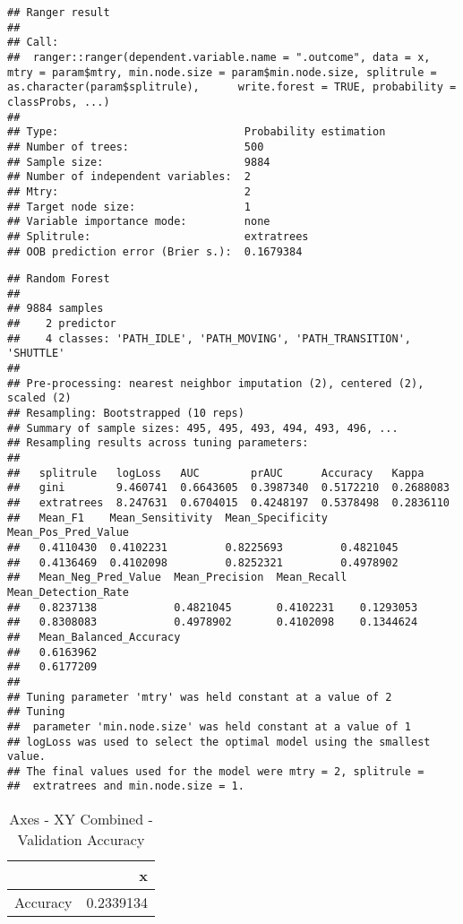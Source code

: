 \documentclass[]{article}
\begin{document}
\begin{verbatim}
## Ranger result
## 
## Call:
##  ranger::ranger(dependent.variable.name = ".outcome", data = x,      mtry = param$mtry, min.node.size = param$min.node.size, splitrule = as.character(param$splitrule),      write.forest = TRUE, probability = classProbs, ...) 
## 
## Type:                             Probability estimation 
## Number of trees:                  500 
## Sample size:                      9884 
## Number of independent variables:  2 
## Mtry:                             2 
## Target node size:                 1 
## Variable importance mode:         none 
## Splitrule:                        extratrees 
## OOB prediction error (Brier s.):  0.1679384
\end{verbatim}

\begin{verbatim}
## Random Forest 
## 
## 9884 samples
##    2 predictor
##    4 classes: 'PATH_IDLE', 'PATH_MOVING', 'PATH_TRANSITION', 'SHUTTLE' 
## 
## Pre-processing: nearest neighbor imputation (2), centered (2), scaled (2) 
## Resampling: Bootstrapped (10 reps) 
## Summary of sample sizes: 495, 495, 493, 494, 493, 496, ... 
## Resampling results across tuning parameters:
## 
##   splitrule   logLoss   AUC        prAUC      Accuracy   Kappa    
##   gini        9.460741  0.6643605  0.3987340  0.5172210  0.2688083
##   extratrees  8.247631  0.6704015  0.4248197  0.5378498  0.2836110
##   Mean_F1    Mean_Sensitivity  Mean_Specificity  Mean_Pos_Pred_Value
##   0.4110430  0.4102231         0.8225693         0.4821045          
##   0.4136469  0.4102098         0.8252321         0.4978902          
##   Mean_Neg_Pred_Value  Mean_Precision  Mean_Recall  Mean_Detection_Rate
##   0.8237138            0.4821045       0.4102231    0.1293053          
##   0.8308083            0.4978902       0.4102098    0.1344624          
##   Mean_Balanced_Accuracy
##   0.6163962             
##   0.6177209             
## 
## Tuning parameter 'mtry' was held constant at a value of 2
## Tuning
##  parameter 'min.node.size' was held constant at a value of 1
## logLoss was used to select the optimal model using the smallest value.
## The final values used for the model were mtry = 2, splitrule =
##  extratrees and min.node.size = 1.
\end{verbatim}

\begin{table}[!h]

\caption{\label{tab:sensor-xy-combined-rf-results}Axes - XY Combined - Validation Accuracy}
\centering
\begin{tabular}[t]{lr}
\toprule
  & x\\
\midrule
Accuracy & 0.2339134\\
\bottomrule
\end{tabular}
\end{table}
\end{document}
